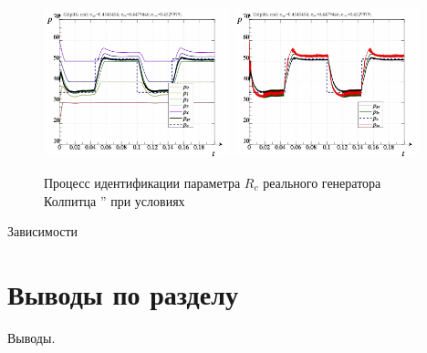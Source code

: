 \begin{figure}[htb!]
  \centerline{
    \includegraphics[width=0.48\textwidth]{p/colp_real_id_qi_fv5-p_p_01.png}
    \hfill
    \includegraphics[width=0.48\textwidth]{p/colp_real_id_qi_fv5-p_pp_01.png}
  }
  \caption{Процесс идентификации параметра $R_c$ реального генератора Колпитца '' при условиях }
  \label{atu:f:colp_r_id_1}
\end{figure}

Зависимости

\section{Выводы по разделу \thechapter}

Выводы.

